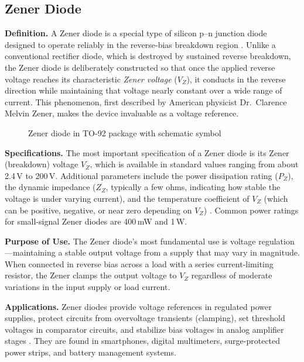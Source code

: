 \documentclass[12pt, a4paper, twoside]{report}
\newcommand{\imgplaceholder}[2]{%
  \begin{figure}[H]
    \centering
    \fcolorbox{gray!60}{gray!12}{%
      \parbox[c][5cm][c]{0.65\textwidth}{%
        \centering
        \textcolor{gray!80}{\Large [Image Placeholder]}\\[6pt]
        \textcolor{gray}{\small Insert figure here}
      }%
    }
    \caption{#1}
    \label{fig:#2}
  \end{figure}
}
\begin{document}
\subsection{Zener Diode}

\textbf{Definition.}\quad
A Zener diode is a special type of silicon p--n junction diode designed to operate
reliably in the reverse-bias breakdown region \cite{boylestad2015}. Unlike a conventional
rectifier diode, which is destroyed by sustained reverse breakdown, the Zener diode is
deliberately constructed so that once the applied reverse voltage reaches its characteristic
\textit{Zener voltage} ($V_Z$), it conducts in the reverse direction while maintaining
that voltage nearly constant over a wide range of current. This phenomenon, first described
by American physicist Dr.\ Clarence Melvin Zener, makes the device invaluable as a voltage
reference.

\imgplaceholder{Zener diode in TO-92 package with schematic symbol}{zener}

\textbf{Specifications.}\quad
The most important specification of a Zener diode is its Zener (breakdown) voltage $V_Z$,
which is available in standard values ranging from about 2.4\,V to 200\,V. Additional
parameters include the power dissipation rating ($P_Z$), the dynamic impedance ($Z_Z$,
typically a few ohms, indicating how stable the voltage is under varying current), and the
temperature coefficient of $V_Z$ (which can be positive, negative, or near zero depending
on $V_Z$) \cite{sedra2020}. Common power ratings for small-signal Zener diodes are
400\,mW and 1\,W.

\textbf{Purpose of Use.}\quad
The Zener diode's most fundamental use is voltage regulation---maintaining a stable
output voltage from a supply that may vary in magnitude. When connected in reverse bias
across a load with a series current-limiting resistor, the Zener clamps the output voltage
to $V_Z$ regardless of moderate variations in the input supply or load current.

\textbf{Applications.}\quad
Zener diodes provide voltage references in regulated power supplies, protect circuits
from overvoltage transients (clamping), set threshold voltages in comparator circuits,
and stabilize bias voltages in analog amplifier stages \cite{boylestad2015}. They are
found in smartphones, digital multimeters, surge-protected power strips, and battery
management systems.
\end{document}
